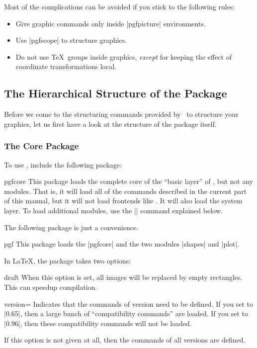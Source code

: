 Most of the complications can be avoided if you stick to the following
rules:

\begin{itemize}
\item
  Give graphic commands only inside |{pgfpicture}| environments.
\item
  Use |{pgfscope}| to structure graphics.
\item
  Do not use \TeX\ groups inside graphics, \emph{except} for keeping
  the effect of coordinate transformations local.
\end{itemize}



\subsection{The Hierarchical Structure of the Package}

Before we come to the structuring commands provided by \pgfname\ to
structure your graphics, let us first have a look at the structure of
the package itself.

\subsubsection{The Core Package}

To use \pgfname, include the following package:

\begin{package}{pgfcore}
  This package loads the complete core of the ``basic layer'' of
  \pgfname, but not any modules. That is, it will load all of the
  commands described in the current part of this manual, but it will
  not load frontends like \tikzname. It will also load the system
  layer. To load additional modules, use the |\usepgfmodule| command 
  explained below.
\end{package}

The following package is just a convenience.

\begin{package}{pgf}
  This package loads the |pgfcore| and the two modules |shapes| and
  |plot|. 

  In \LaTeX, the package takes two options:
  \begin{packageoption}{draft}
    When this option is set, all images will be replaced by empty
    rectangles. This can speedup compilation.
  \end{packageoption}
  
  \begin{packageoption}{version=}
    Indicates that the commands of version  need to be
    defined. If you set  to |0.65|, then a large bunch of
    ``compatibility commands'' are loaded. If you set  to
    |0.96|, then these compatibility commands will not be loaded.
    
    If this option is not given at all, then the commands of all
    versions are defined.
  \end{packageoption}
\end{package}



